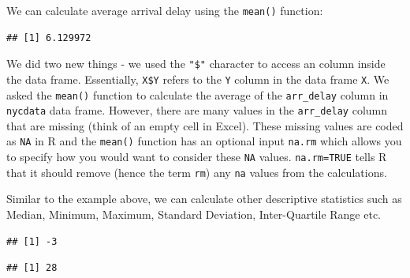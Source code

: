 \documentclass[11pt, letterpaper, twoside]{memoir}\usepackage{knitr}
\begin{document}
We can calculate average arrival delay using the \texttt{mean()}  function:

\begin{knitrout}
\color{fgcolor}\begin{kframe}
\begin{alltt}
\hlopt{$}  \hlstd{=} \hlstd{)}
\end{alltt}
\begin{verbatim}
## [1] 6.129972
\end{verbatim}
\end{kframe}
\end{knitrout}

We did two new things - we used the \verb|"$"| character to access an column inside the data frame. Essentially, \verb|X$Y| refers to the \texttt{Y} column in the data frame \texttt{X}. We asked the \texttt{mean()} function to calculate the average of the \verb|arr_delay| column in \texttt{nycdata} data frame. However, there are many values in the \verb|arr_delay| column that are missing (think of an empty cell in Excel). These missing values are coded as \texttt{NA} in R and the \texttt{mean()} function has an optional input \texttt{na.rm} which allows you to specify how you would want to consider these \texttt{NA} values. \texttt{na.rm=TRUE} tells R that it should remove (hence the term \texttt{rm}) any \texttt{na} values from the calculations.

Similar to the example above, we can calculate other descriptive statistics such as Median, Minimum, Maximum, Standard Deviation, Inter-Quartile Range etc.

\begin{knitrout}
\color{fgcolor}\begin{kframe}
\begin{alltt}
\hlopt{$}  \hlstd{=} \hlstd{)}
\end{alltt}
\begin{verbatim}
## [1] -3
\end{verbatim}
\begin{alltt}
\hlopt{$}  \hlstd{=} \hlstd{)}
\end{alltt}
\begin{verbatim}
## [1] 28
\end{verbatim}
\end{kframe}
\end{knitrout}
\end{document}
